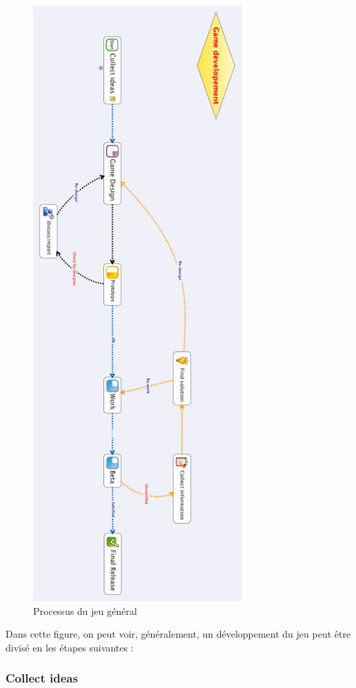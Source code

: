 \begin{figure}[htbp]
	\centering
		\includegraphics[height=9in]{XMinds/Gamedevelopement.png}

	\caption{Processus du jeu général}
	\label{fig:XMinds_Gamedevelopement}
\end{figure}

Dans cette figure, on peut voir, généralement, un développement du jeu peut être divisé en les étapes suivantes :

\subsubsection{Collect ideas} %

